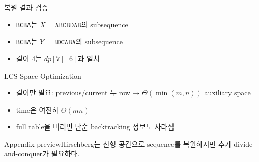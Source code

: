 \begin{frame}{복원 결과 검증}
\begin{itemize}\item \texttt{BCBA}는 $X=\texttt{ABCBDAB}$의 subsequence\item \texttt{BCBA}는 $Y=\texttt{BDCABA}$의 subsequence\item 길이 4는 $dp[7][6]$과 일치\end{itemize}
\end{frame}
\begin{frame}{LCS Space Optimization}
\optional[선택 심화]\hfill
\begin{itemize}\item 길이만 필요: previous/current 두 row → $\Theta(\min(m,n))$ auxiliary space\item time은 여전히 $\Theta(mn)$\item full table을 버리면 단순 backtracking 정보도 사라짐\end{itemize}
\begin{block}{Appendix preview}Hirschberg는 선형 공간으로 sequence를 복원하지만 추가 divide-and-conquer가 필요하다.\end{block}
\vfill{}
\end{frame}

